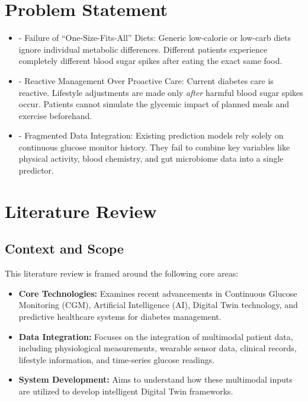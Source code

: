 \documentclass[12pt]{article}
\begin{document}
\section{Problem Statement}
\begin{itemize}[leftmargin=*, noitemsep]
    \item - {Failure of ``One-Size-Fits-All'' Diets:} Generic low-calorie or low-carb diets ignore individual metabolic differences. Different patients experience completely different blood sugar spikes after eating the exact same food.
    \item - {Reactive Management Over Proactive Care:} Current diabetes care is reactive. Lifestyle adjustments are made only \emph{after} harmful blood sugar spikes occur. Patients cannot simulate the glycemic impact of planned meals and exercise beforehand.
    \item - {Fragmented Data Integration:} Existing prediction models rely solely on continuous glucose monitor history. They fail to combine key variables like physical activity, blood chemistry, and gut microbiome data into a single predictor.
\end{itemize}

\vspace{2.5cm}

\section{Literature Review}

\subsection{Context and Scope}

This literature review is framed around the following core areas:
\begin{itemize}[leftmargin=*, noitemsep]
    \item \textbf{Core Technologies:} Examines recent advancements in Continuous Glucose Monitoring (CGM), Artificial Intelligence (AI), Digital Twin technology, and predictive healthcare systems for diabetes management.
    \item \textbf{Data Integration:} Focuses on the integration of multimodal patient data, including physiological measurements, wearable sensor data, clinical records, lifestyle information, and time-series glucose readings.
    \item \textbf{System Development:} Aims to understand how these multimodal inputs are utilized to develop intelligent Digital Twin frameworks.
\end{itemize}
\end{document}

